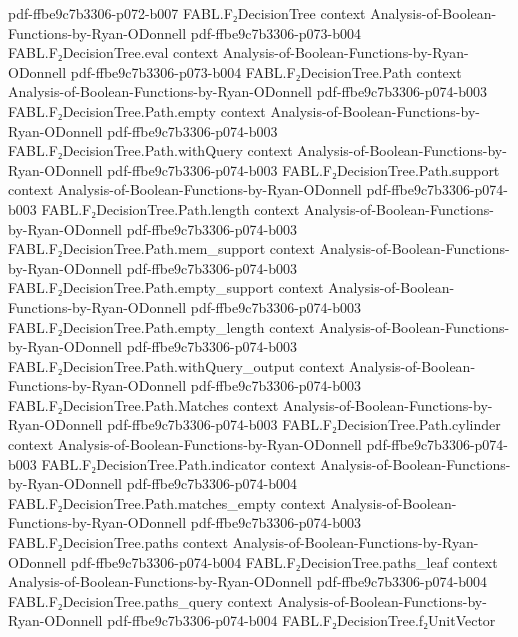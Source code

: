 \begin{theorem}
  {pdf-ffbe9c7b3306-p072-b007}
\proofstep
  {FABL.F₂DecisionTree}
  {context}
  {Analysis-of-Boolean-Functions-by-Ryan-ODonnell}
  {pdf-ffbe9c7b3306-p073-b004}
\proofstep
  {FABL.F₂DecisionTree.eval}
  {context}
  {Analysis-of-Boolean-Functions-by-Ryan-ODonnell}
  {pdf-ffbe9c7b3306-p073-b004}
\proofstep
  {FABL.F₂DecisionTree.Path}
  {context}
  {Analysis-of-Boolean-Functions-by-Ryan-ODonnell}
  {pdf-ffbe9c7b3306-p074-b003}
\proofstep
  {FABL.F₂DecisionTree.Path.empty}
  {context}
  {Analysis-of-Boolean-Functions-by-Ryan-ODonnell}
  {pdf-ffbe9c7b3306-p074-b003}
\proofstep
  {FABL.F₂DecisionTree.Path.withQuery}
  {context}
  {Analysis-of-Boolean-Functions-by-Ryan-ODonnell}
  {pdf-ffbe9c7b3306-p074-b003}
\proofstep
  {FABL.F₂DecisionTree.Path.support}
  {context}
  {Analysis-of-Boolean-Functions-by-Ryan-ODonnell}
  {pdf-ffbe9c7b3306-p074-b003}
\proofstep
  {FABL.F₂DecisionTree.Path.length}
  {context}
  {Analysis-of-Boolean-Functions-by-Ryan-ODonnell}
  {pdf-ffbe9c7b3306-p074-b003}
\proofstep
  {FABL.F₂DecisionTree.Path.mem_support}
  {context}
  {Analysis-of-Boolean-Functions-by-Ryan-ODonnell}
  {pdf-ffbe9c7b3306-p074-b003}
\proofstep
  {FABL.F₂DecisionTree.Path.empty_support}
  {context}
  {Analysis-of-Boolean-Functions-by-Ryan-ODonnell}
  {pdf-ffbe9c7b3306-p074-b003}
\proofstep
  {FABL.F₂DecisionTree.Path.empty_length}
  {context}
  {Analysis-of-Boolean-Functions-by-Ryan-ODonnell}
  {pdf-ffbe9c7b3306-p074-b003}
\proofstep
  {FABL.F₂DecisionTree.Path.withQuery_output}
  {context}
  {Analysis-of-Boolean-Functions-by-Ryan-ODonnell}
  {pdf-ffbe9c7b3306-p074-b003}
\proofstep
  {FABL.F₂DecisionTree.Path.Matches}
  {context}
  {Analysis-of-Boolean-Functions-by-Ryan-ODonnell}
  {pdf-ffbe9c7b3306-p074-b003}
\proofstep
  {FABL.F₂DecisionTree.Path.cylinder}
  {context}
  {Analysis-of-Boolean-Functions-by-Ryan-ODonnell}
  {pdf-ffbe9c7b3306-p074-b003}
\proofstep
  {FABL.F₂DecisionTree.Path.indicator}
  {context}
  {Analysis-of-Boolean-Functions-by-Ryan-ODonnell}
  {pdf-ffbe9c7b3306-p074-b004}
\proofstep
  {FABL.F₂DecisionTree.Path.matches_empty}
  {context}
  {Analysis-of-Boolean-Functions-by-Ryan-ODonnell}
  {pdf-ffbe9c7b3306-p074-b003}
\proofstep
  {FABL.F₂DecisionTree.paths}
  {context}
  {Analysis-of-Boolean-Functions-by-Ryan-ODonnell}
  {pdf-ffbe9c7b3306-p074-b004}
\proofstep
  {FABL.F₂DecisionTree.paths_leaf}
  {context}
  {Analysis-of-Boolean-Functions-by-Ryan-ODonnell}
  {pdf-ffbe9c7b3306-p074-b004}
\proofstep
  {FABL.F₂DecisionTree.paths_query}
  {context}
  {Analysis-of-Boolean-Functions-by-Ryan-ODonnell}
  {pdf-ffbe9c7b3306-p074-b004}
\proofstep
  {FABL.F₂DecisionTree.f₂UnitVector}

\end{theorem}
